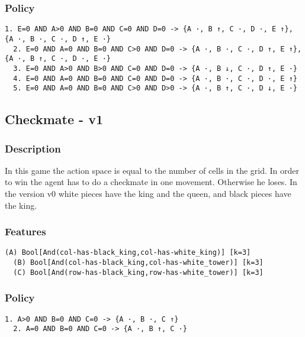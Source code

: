 \documentclass[a4paper]{article}
\begin{document}
\subsubsection{Policy}
\begin{Verbatim}[fontsize=\footnotesize]
  1. E=0 AND A>0 AND B=0 AND C=0 AND D=0 -> {A ·, B ↑, C ·, D ·, E ↑}, {A ·, B ·, C ·, D ↑, E ·}
  2. E=0 AND A=0 AND B=0 AND C>0 AND D=0 -> {A ·, B ·, C ·, D ↑, E ↑}, {A ·, B ↑, C ·, D ·, E ·}
  3. E=0 AND A>0 AND B>0 AND C=0 AND D=0 -> {A ·, B ↓, C ·, D ↑, E ·}
  4. E=0 AND A=0 AND B=0 AND C=0 AND D=0 -> {A ·, B ·, C ·, D ·, E ↑}
  5. E=0 AND A=0 AND B=0 AND C>0 AND D>0 -> {A ·, B ↑, C ·, D ↓, E ·}

\end{Verbatim}

\subsection{Checkmate - v1}
\subsubsection{Description}
In this game the action space is equal to the number of cells in the grid. In order to win the agent has to do a checkmate in one movement. Otherwise he loses. In the version v0 white pieces have the king and the queen, and black pieces have the king.

\subsubsection{Features}
\begin{Verbatim}[fontsize=\footnotesize]
  (A) Bool[And(col-has-black_king,col-has-white_king)] [k=3]
  (B) Bool[And(col-has-black_king,col-has-white_tower)] [k=3]
  (C) Bool[And(row-has-black_king,row-has-white_tower)] [k=3]

\end{Verbatim}

\subsubsection{Policy}
\begin{Verbatim}[fontsize=\footnotesize]
  1. A>0 AND B=0 AND C=0 -> {A ·, B ·, C ↑}
  2. A=0 AND B=0 AND C=0 -> {A ·, B ↑, C ·}

\end{Verbatim}

\newpage
\end{document}
